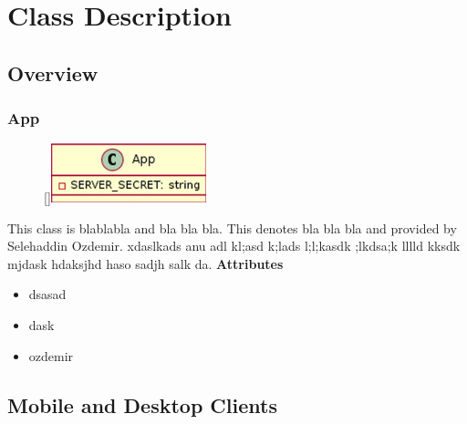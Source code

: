\section{Class Description}
\subsection{Overview}
\subsubsection{App}
\begin{figure}
    \raisebox{0pt}[\dimexpr{}\baselineskip\relax]{\includegraphics[width=4.5cm]{classes/auth/app.png}}
\end{figure} 
\par
This class is blablabla and bla bla bla. This denotes bla bla bla and provided by Selehaddin Ozdemir. xdaslkads anu adl kl;asd k;lads l;l;kasdk ;lkdsa;k lllld kksdk mjdask hdaksjhd haso sadjh salk da.
\newline
\newline
\textbf{Attributes}\newline
\begin{itemize}
    \item dsasad
    \item dask
    \item ozdemir
\end{itemize}
\subsection{Mobile and Desktop Clients}
